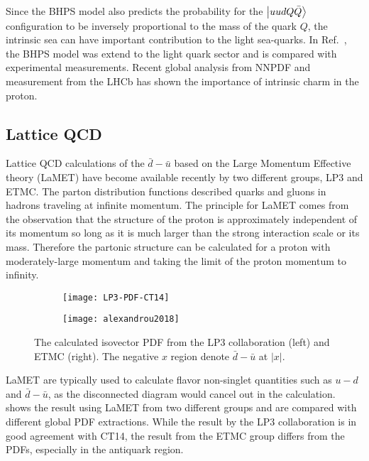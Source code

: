\documentclass[../main.tex]{subfiles}
\begin{document}

Since the BHPS model also predicts the probability for the $\ket{uudQ\bar{Q}}$ configuration to
be inversely proportional to the mass of the quark $Q$, the intrinsic sea can have important
contribution to the light sea-quarks. In Ref.~\cite{chang2011,chang2011a}, the BHPS model
was extend to the light quark sector and is compared with experimental measurements.
Recent global analysis from NNPDF \cite{ball2022} and measurement from the LHCb \cite{aaij2022}
has shown the importance of intrinsic charm in the proton.



\subsection{Lattice QCD}
Lattice QCD calculations of the $\bar{d} - \bar{u}$ based on the Large Momentum Effective
theory (LaMET) \cite{ji2021,constantinou2021} have become available recently by two different groups,
LP3\cite{chen2018} and ETMC\cite{alexandrou2018}.
The parton distribution functions described quarks and gluons in hadrons traveling at infinite
momentum. The principle for LaMET comes from the observation that the structure of the proton is
approximately independent of its momentum so long as it is much larger than the strong interaction
scale or its mass. Therefore the partonic structure can be calculated for a proton with
moderately-large momentum and taking the limit of the proton momentum to infinity.

\begin{figure}[h!]
	\centering
	\begin{subfigure}{0.45\linewidth}
		\texttt{[image: LP3-PDF-CT14]}
	\end{subfigure}
	\begin{subfigure}{0.45\linewidth}
		\texttt{[image: alexandrou2018]}
	\end{subfigure}
	\caption{The calculated isovector PDF from the LP3 collaboration (left)
		\cite{chen2018} and ETMC (right)\cite{alexandrou2018}.
		The negative $x$ region denote $\bar{d}-\bar{u}$ at $\left|x\right|$.}
	\label{fig:lamet}
\end{figure}
LaMET are typically used to calculate flavor non-singlet quantities such as $u-d$ and $\bar{d}-\bar{u}$,
as the disconnected diagram would cancel out in the calculation.
 shows the result using LaMET from two different groups and are compared with
different global PDF extractions. While the result by the LP3 collaboration
is in good agreement with CT14, the result from the ETMC group differs from the PDFs,
especially in the antiquark region.
\end{document}
